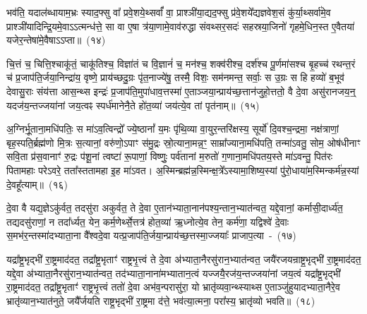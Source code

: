 भव॑ति॒ यदाल॑ब्धायाम॒भ्रः स्याद॒फ्सु वा᳚ प्रवे॒शये॒थ्सर्वां᳚ वा॒ प्राश्ञी॑या॒द्यद॒फ्सु प्र॑वे॒शये᳚द्यज्ञवेश॒सं कु॑र्या॒थ्सर्वा॑मे॒व प्राश्ञी॑या\-दिन्द्रि॒य\-मे॒वा\-ऽऽ\-त्मन्ध॑त्ते॒ सा वा ए॒षा त्र॑या॒णामे॒वाव॑रुद्धा संवथ्सर॒सदः॑ सहस्रया॒जिनो॑ गृहमे॒धिन॒स्त ए॒वैतया॑ यजेर॒न्तेषा॑\-मे॒वै\-षा\-ऽऽ\-प्ता॥~(१४)\ip

{\anuvakamend[{यथ्स्वेन॑ सारस्व॒तीमा ल॑भेत॒ यः कामा॑य त्वा॒ कामो\-ऽप॒ इत्य॒भ्रो द्विच॑त्वारिꣳशच्च}]}

चि॒त्तं च॒ चित्ति॒श्चाकू॑तं॒ चाकू॑तिश्च॒ विज्ञा॑तं च वि॒ज्ञानं॑ च॒ मन॑श्च॒ शक्व॑रीश्च॒ दर्\mbox{}श॑श्च पू॒र्णमा॑सश्च बृ॒हच्च॑ रथन्त॒रं च॑ प्र॒जा\-प॑ति॒र्जया॒निन्द्रा॑य॒ वृष्णे॒ प्राय॑च्छदु॒ग्रः पृ॑त॒नाज्ये॑षु॒ तस्मै॒ विशः॒ सम॑नमन्त॒ सर्वाः॒ स उ॒ग्रः स हि हव्यो॑ ब॒भूव॑ देवासु॒राः संय॑त्ता आस॒न्थ्स इन्द्रः॑ प्र॒जा\-प॑ति॒मुपा॑धाव॒त्तस्मा॑ ए॒ताञ्जया॒न्प्राय॑च्छ॒त्तान॑जुहो॒त्ततो॒ वै दे॒वा असु॑रानजय॒न्॒ य\-दज॑य॒न्तज्जया॑नां जय॒त्वꣴ स्पर्ध॑मानेनै॒ते हो॑त॒व्या॑ जय॑त्ये॒व तां पृत॑नाम्॥~(१५)\ip

{\anuvakamend[{उप॒ पञ्च॑विꣳशतिश्च}]}

अ॒ग्निर्भू॒ताना॒मधि॑\-पतिः॒ स मा॑\-ऽव॒त्विन्द्रो᳚ ज्ये॒ष्ठानां᳚ य॒मः पृ॑थि॒व्या वा॒युर॒न्त\-रि॑क्षस्य॒ सूर्यो॑ दि॒वश्च॒न्द्रमा॒ नक्ष॑त्राणां॒ बृह॒स्पति॒र्ब्रह्म॑णो मि॒त्रः स॒त्यानां॒ वरु॑णो॒\-ऽपाꣳ स॑मु॒द्रः स्रो॒त्याना॒मन्न॒ꣳ॒ साम्रा᳚ज्याना॒मधि॑\-पति॒ तन्मा॑\-ऽवतु॒ सोम॒ ओष॑धीनाꣳ सवि॒ता प्र॑स॒वानाꣳ॑ रु॒द्रः प॑शू॒नां त्वष्टा॑ रू॒पाणां॒ विष्णुः॒ पर्व॑तानां म॒रुतो॑ ग॒णाना॒मधि॑पतय॒स्ते मा॑\-ऽवन्तु॒ पित॑रः पितामहाः परे\-ऽवरे॒ तता᳚स्ततामहा इ॒ह मा॑\-ऽवत। अ॒स्मिन्ब्रह्म॑न्न॒स्मिन्क्ष॒त्रे᳚\-ऽस्यामा॒शिष्य॒स्यां पु॑रो॒धाया॑\-म॒स्मिन्कर्म॑न्न॒स्यां दे॒वहू᳚त्याम्॥~(१६)\ip

{\anuvakamend[{अ॒व॒रे॒ स॒प्तद॑श च}]}

दे॒वा वै यद्य॒ज्ञे\-ऽकु॑र्वत॒ तदसु॑रा अकुर्वत॒ ते दे॒वा ए॒तान॑भ्याता॒नान॑पश्य॒न्तान॒भ्यात॑न्वत॒ यद्दे॒वानां॒ कर्मासी॒दार्ध्य॑त॒ तद्यदसु॑राणां॒ न तदा᳚र्ध्यत॒ येन॒ कर्म॒णेर्थ्से॒त्तत्र॑ होत॒व्या॑ ऋ॒ध्नोत्ये॒व तेन॒ कर्म॑णा॒ यद्विश्वे॑ दे॒वाः स॒मभ॑र॒न्तस्मा॑दभ्याता॒ना वै᳚श्वदे॒वा यत्प्र॒जा\-प॑ति॒र्जया॒न्प्राय॑च्छ॒त्तस्मा॒ज्जयाः᳚ प्राजाप॒त्या~-~(१७)\ip

यद्रा᳚ष्ट्र॒भृद्भी॑ रा॒ष्ट्रमाद॑दत॒ तद्रा᳚ष्ट्र॒भृताꣳ॑ राष्ट्रभृ॒त्त्वं ते दे॒वा अ॑भ्याता॒नैरसु॑रान॒भ्यात॑न्वत॒ जयै॑रजयन्राष्ट्र॒भृद्भी॑ रा॒ष्ट्रमाद॑दत॒ यद्दे॒वा अ॑भ्याता॒नैरसु॑रान॒भ्यात॑न्वत॒ तद॑भ्याता॒नाना॑\-मभ्यातान॒त्वं यज्जयै॒रज॑य॒न्तज्जया॑नां जय॒त्वं यद्रा᳚ष्ट्र॒भृद्भी॑ रा॒ष्ट्रमाद॑दत॒ तद्रा᳚ष्ट्र॒भृताꣳ॑ राष्ट्रभृ॒त्त्वं ततो॑ दे॒वा अभ॑व॒न्परासु॑रा॒ यो भ्रातृ॑व्यवा॒न्थ्स्याथ्स ए॒ताञ्जु॑हुयादभ्याता॒नैरे॒व भ्रातृ॑व्यान॒भ्यात॑नुते॒ जयै᳚र्जयति राष्ट्र॒भृद्भी॑ रा॒ष्ट्रमा द॑त्ते॒ भव॑त्या॒त्मना॒ परा᳚स्य॒ भ्रातृ॑व्यो भवति॥~(१८)\ip

